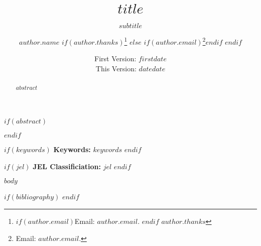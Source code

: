 \documentclass[$if(fontsize)$$fontsize$$else$11pt$endif$,$for(classoption)$$classoption$$sep$,$endfor$]{article}
\title{$title$}
\subtitle{$subtitle$}
\author{$author.name$%
        $if(author.thanks)$\thanks{%
            $if(author.email)$Email: $author.email$. $endif$%
            $author.thanks$}%
        $else$%
            $if(author.email)$\thanks{Email:  $author.email$.}$endif$%
        $endif$}
\affil{$author.affil$}
\date{First Version:  $firstdate$ \\[0.5em] This Version:  $date$}
\date{$date$}
\begin{document}
\maketitle
\thispagestyle{empty}

$if(abstract)$
\begin{abstract}
$abstract$
\end{abstract}
\smallskip
$endif$

$if(keywords)$
\hspace{4mm}\textbf{Keywords:}  $keywords$
\smallskip
$endif$

$if(jel)$
\hspace{4mm}\textbf{JEL Classificiation:} $jel$
$endif$

\clearpage
{}
\doublespacing
\raggedright
\setlength\parindent{4em}

$body$

$if(bibliography)$
\newpage
\printbibliography[heading=bibintoc,title={References}]
$endif$
\end{document}

